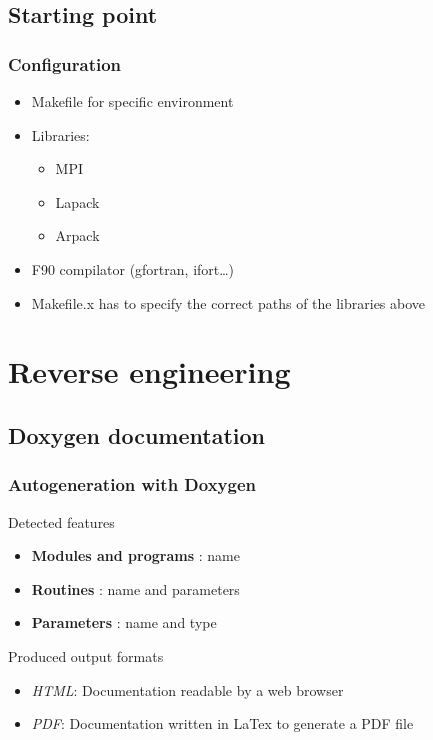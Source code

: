 \documentclass[10p]{beamer}
\begin{document}
\subsection{Starting point}
\begin{frame}
\frametitle{Configuration}
\begin{itemize}
\item Makefile for specific environment
\item Libraries:
\begin{itemize}
\item MPI
\item Lapack
\item Arpack
\end{itemize}
\item F90 compilator (gfortran, ifort…)
\item Makefile.x has to specify the correct paths of the libraries above
\end{itemize}
\end{frame}
\section{Reverse engineering}
\subsection{Doxygen documentation}
\begin{frame}
\frametitle{Autogeneration with Doxygen}
\begin{block}{Detected features}
\begin{itemize}
\item \textbf{Modules and programs} : name
\item \textbf{Routines} : name and parameters
\item \textbf{Parameters} : name and type
\end{itemize}
\end{block}
\begin{block}{Produced output formats}
\begin{itemize}
\item \textit{HTML}: Documentation readable by a web browser
\item \textit{PDF}: Documentation written in LaTex to generate a PDF file
\end{itemize}
\end{block}
\end{frame}
\end{document}
